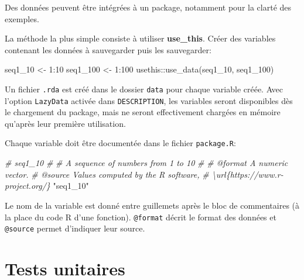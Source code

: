 \documentclass[
  11pt,
  french,
  a4paper,
  extrafontsizes,onecolumn,openright
  ]{memoir}
\newenvironment{Shaded}{\begin{snugshade}}{\end{snugshade}}
\newcommand{\CommentTok}[1]{\textcolor[rgb]{0.56,0.35,0.01}{\textit{#1}}}
\newcommand{\DecValTok}[1]{\textcolor[rgb]{0.00,0.00,0.81}{#1}}
\newcommand{\FunctionTok}[1]{\textcolor[rgb]{0.00,0.00,0.00}{#1}}
\newcommand{\NormalTok}[1]{#1}
\newcommand{\OtherTok}[1]{\textcolor[rgb]{0.56,0.35,0.01}{#1}}
\newcommand{\SpecialCharTok}[1]{\textcolor[rgb]{0.00,0.00,0.00}{#1}}
\newcommand{\StringTok}[1]{\textcolor[rgb]{0.31,0.60,0.02}{#1}}
\begin{document}
Des données peuvent être intégrées à un package, notamment pour la clarté des exemples.

La méthode la plus simple consiste à utiliser \textbf{use\_this}.
Créer des variables contenant les données à sauvegarder puis les sauvegarder:

\scriptsize

\begin{Shaded}
\begin{Highlighting}[]
\NormalTok{seq1\_10 }\OtherTok{\textless{}{-}} \DecValTok{1}\SpecialCharTok{:}\DecValTok{10}
\NormalTok{seq1\_100 }\OtherTok{\textless{}{-}} \DecValTok{1}\SpecialCharTok{:}\DecValTok{100}
\NormalTok{usethis}\SpecialCharTok{::}\FunctionTok{use\_data}\NormalTok{(seq1\_10, seq1\_100)}
\end{Highlighting}
\end{Shaded}

\normalsize

Un fichier \texttt{.rda} est créé dans le dossier \texttt{data} pour chaque variable créée.
Avec l'option \texttt{LazyData} activée dans \texttt{DESCRIPTION}, les variables seront disponibles dès le chargement du package, mais ne seront effectivement chargées en mémoire qu'après leur première utilisation.

Chaque variable doit être documentée dans le fichier \texttt{package.R}:

\scriptsize

\begin{Shaded}
\begin{Highlighting}[]
\CommentTok{\#\textquotesingle{} seq1\_10}
\CommentTok{\#\textquotesingle{}}
\CommentTok{\#\textquotesingle{} A sequence of numbers from 1 to 10}
\CommentTok{\#\textquotesingle{}}
\CommentTok{\#\textquotesingle{} @format A numeric vector.}
\CommentTok{\#\textquotesingle{} @source Values computed by the R software, }
\CommentTok{\#\textquotesingle{}   \textbackslash{}url\{https://www.r{-}project.org/\}}
\StringTok{"seq1\_10"}
\end{Highlighting}
\end{Shaded}

\normalsize

Le nom de la variable est donné entre guillemets après le bloc de commentaires (à la place du code R d'une fonction).
\texttt{@format} décrit le format des données et \texttt{@source} permet d'indiquer leur source.

\hypertarget{tests-unitaires}{%
\section{Tests unitaires}\label{tests-unitaires}}
\end{document}
